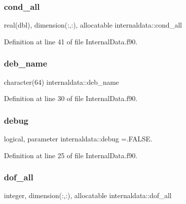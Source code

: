 \mbox{\label{namespaceinternaldata_aeb804e680e34df79573f79272474bd2c}} 
\subsubsection{\texorpdfstring{cond\+\_\+all}{cond\_all}}
{\footnotesize\ttfamily real(dbl), dimension(\+:,\+:), allocatable internaldata\+::cond\+\_\+all}



Definition at line 41 of file Internal\+Data.\+f90.

\mbox{\label{namespaceinternaldata_abe3cfd1606a2a73e5e71421a1abc89dd}} 
\subsubsection{\texorpdfstring{deb\+\_\+name}{deb\_name}}
{\footnotesize\ttfamily character(64) internaldata\+::deb\+\_\+name}



Definition at line 30 of file Internal\+Data.\+f90.

\mbox{\label{namespaceinternaldata_a0c3051eb2c273aad5bebc55fd79236ea}} 
\subsubsection{\texorpdfstring{debug}{debug}}
{\footnotesize\ttfamily logical, parameter internaldata\+::debug =.F\+A\+L\+S\+E.}



Definition at line 25 of file Internal\+Data.\+f90.

\mbox{\label{namespaceinternaldata_a64b1e517fcf8a25bce3446ec324a4698}} 
\subsubsection{\texorpdfstring{dof\+\_\+all}{dof\_all}}
{\footnotesize\ttfamily integer, dimension(\+:,\+:), allocatable internaldata\+::dof\+\_\+all}



